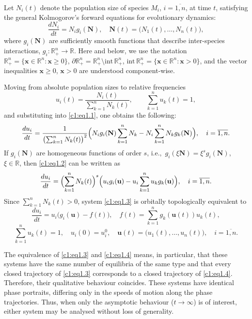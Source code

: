 \documentclass[12pt]{report}
\newcommand{\R}{\mathbb{R}}
\newcommand{\inside}{\mathrm{int}\,}
\newcommand{\bound}{\partial}
\theoremstyle{definition}
\theoremstyle{remark}
\begin{document}
Let $N_{i}(t)$ denote the population size of species $M_{i}$,
$i = \overline{1, n}$, at time $t$, satisfying the general
Kolmogorov's forward equations for evolutionary dynamics:
\begin{equation}
  \frac{dN_{i}}{dt} = N_{i}g_{i}(\mathbf{N}),\quad
  \mathbf{N}(t) = \bigl(N_{1}(t),\ldots,N_{n}(t)\bigr),
  \label{c1:eq1.1}
\end{equation}
where $g_{i}(\mathbf{N})$ are sufficiently smooth functions that describe inter-species interactions, $g_{i}:\R_{+}^{n}\to\R$.
Here and below, we use the notation
$\R_{+}^{n}=\{\mathbf{x}\in\R^{n}:\mathbf{x}\geqslant 0\}$,
$\bound\R_{+}^{n}=\R_{+}^{n}\setminus\inside\R_{+}^{n}$,
$\inside\R_{+}^{n}=\{\mathbf{x}\in\R^{n}:\mathbf{x}>0\}$,
and the vector inequalities $\mathbf{x}\geqslant 0$, $\mathbf{x}>0$
are understood component-wise.

Moving from absolute population sizes to relative frequencies
\[
  u_{i}(t)=\frac{N_{i}(t)}{\sum_{k=1}^{n}N_{k}(t)},\qquad
  \sum_{k=1}^{n}u_{k}(t)=1,
\]
and substituting into \eqref{c1:eq1.1}, one obtains the following:
\begin{equation}
      \frac{du_{i}}{dt}=
  \frac{1}{\bigl(\sum_{k=1}^{n}N_{k}(t)\bigr)^{2}}
  \Bigl(N_{i}g_{i}(\mathbf{N})\sum_{k=1}^{n}N_{k}
       - N_{i}\sum_{k=1}^{n}N_{k}g_{k}(\mathbf{N})\Bigr),
  \quad i=\overline{1,n}.
  \label{c1:eq1.2}
\end{equation}
If $g_{i}(\mathbf{N})$ are homogeneous functions of order $s$,
i.e.,\ $g_{i}(\xi\mathbf{N})=\xi^{s}g_{i}(\mathbf{N})$,
$\xi\in\R$, then \eqref{c1:eq1.2} can be written as
\begin{equation}
  \frac{du_{i}}{dt}=
  \Bigl(\sum_{k=1}^{n}N_{k}(t)\Bigr)^{s}
  \Bigl(u_{i}g_{i}(\mathbf{u})
       - u_{i}\sum_{k=1}^{n}u_{k}g_{k}(\mathbf{u})\Bigr),
  \quad i=\overline{1,n}.
  \label{c1:eq1.3}
\end{equation}
Since $\sum_{k=1}^{n}N_{k}(t)>0$, system \eqref{c1:eq1.3} is
orbitally topologically equivalent \cite{c1:Arnold1978}
to
\begin{equation}
  \frac{du_{i}}{dt}=u_{i}\bigl(g_{i}(\mathbf{u})-f(t)\bigr),
  \quad f(t)=\sum_{k=1}^{n}g_{k}(\mathbf{u}(t))u_{k}(t),
  \label{c1:eq1.4}
\end{equation}
\[
  \sum_{k=1}^{n}u_{k}(t)=1,\quad u_{i}(0)=u_{i}^{0}, \quad \mathbf{u}(t) = \bigl(u_1(t), \ldots, u_n(t)\bigr),\quad
  i=\overline{1,n}.
\]

The equivalence of \eqref{c1:eq1.3} and \eqref{c1:eq1.4} means, in
particular, that these systems have the same number of equilibria
of the same type and that every closed trajectory of \eqref{c1:eq1.3}
corresponds to a closed trajectory of \eqref{c1:eq1.4}. Therefore, their qualitative behaviour coincides. These systems have identical phase portraits, differing only in the speeds of motion along the phase trajectories. Thus, when only the
asymptotic behaviour ($t\to\infty$) is of interest, either system
may be analysed without loss of generality.
\end{document}
